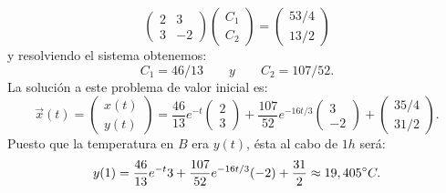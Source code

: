 \begin{ejemplo}
	\begin{equation}
		\begin{pmatrix}
			2 & 3\\ 
			3 & -2
		\end{pmatrix}\begin{pmatrix}	C_1 \\ C_2	\end{pmatrix} = \begin{pmatrix}	53/4 \\ 13/2	\end{pmatrix}
	\end{equation}
	y resolviendo el sistema obtenemos:
	\begin{equation}
		C_1 = 46/13 \qquad y \qquad C_2 = 107/52.
	\end{equation}
	La solución a este problema de valor inicial es:
	\begin{equation}
		\vec{x}(t) = \begin{pmatrix}	x(t) \\ y(t)	\end{pmatrix} = \dfrac{46}{13}e^{-t}\begin{pmatrix}	2 \\ 3	\end{pmatrix} + \dfrac{107}{52}e^{-16t/3}\begin{pmatrix}	3 \\ -2	\end{pmatrix} + \begin{pmatrix}	35/4 \\ 31/2	\end{pmatrix}.
	\end{equation}
	Puesto que la temperatura en $B$ era $y(t)$, ésta al cabo de $1h$ será:
	\begin{equation}
		y(1) = \dfrac{46}{13}e^{-t}3 + \dfrac{107}{52}e^{-16t/3}(-2) + \dfrac{31}{2} \approx 19,405\degree C.
	\end{equation}
\end{ejemplo}
